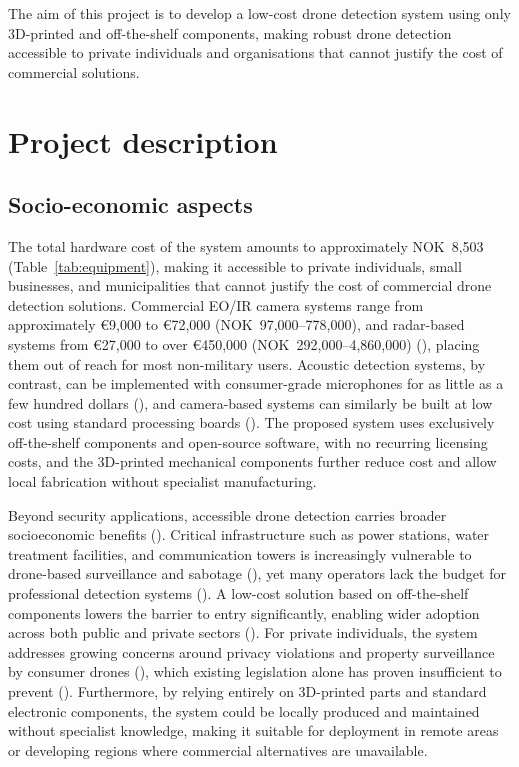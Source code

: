 The aim of this project is to develop a low-cost drone detection system using only 
3D-printed and off-the-shelf components, making robust drone detection accessible 
to private individuals and organisations that cannot justify the cost of commercial 
solutions.

\section{Project description}

\subsection{Socio-economic aspects}


The total hardware cost of the system amounts to approximately NOK~8,503 
(Table~\ref{tab:equipment}), making it accessible to private individuals, 
small businesses, and municipalities that cannot justify the cost of commercial 
drone detection solutions. Commercial EO/IR camera systems range from approximately 
€9,000 to €72,000 (NOK~97,000--778,000), and radar-based systems from €27,000 to 
over €450,000 (NOK~292,000--4,860,000) (\cite{airsight2025buyersguide}), placing them out of 
reach for most non-military users. Acoustic detection systems, by contrast, can be 
implemented with consumer-grade microphones for as little as a few hundred dollars 
(\cite{macedo2025drone}), and camera-based systems can similarly be built at low cost 
using standard processing boards (\cite{macedo2025drone}). The proposed system uses 
exclusively off-the-shelf components and open-source software, with no recurring 
licensing costs, and the 3D-printed mechanical components further reduce cost and 
allow local fabrication without specialist manufacturing.

Beyond security applications, accessible drone detection carries broader 
socioeconomic benefits (\cite{seidaliyeva2024advances}). Critical infrastructure 
such as power stations, water treatment facilities, and communication towers is 
increasingly vulnerable to drone-based surveillance and sabotage 
(\cite{seidaliyeva2024advances}), yet many operators lack the budget for professional 
detection systems (\cite{macedo2025drone}). A low-cost solution based on off-the-shelf 
components lowers the barrier to entry significantly, enabling wider adoption across 
both public and private sectors (\cite{macedo2025drone}). For private individuals, 
the system addresses growing concerns around privacy violations and property 
surveillance by consumer drones (\cite{seidaliyeva2024advances}), which existing 
legislation alone has proven insufficient to prevent (\cite{seidaliyeva2024advances}). 
Furthermore, by relying entirely on 3D-printed parts and standard electronic 
components, the system could be locally produced and maintained without specialist 
knowledge, making it suitable for deployment in remote areas or developing regions 
where commercial alternatives are unavailable.

